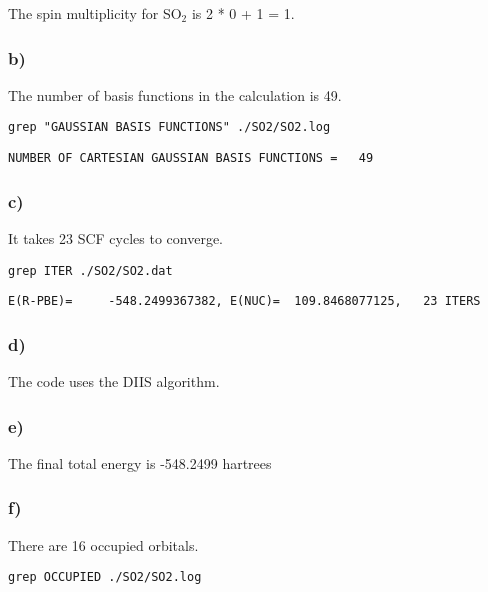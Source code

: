 \documentclass[11pt]{article}
\begin{document}
The spin multiplicity for SO$_{\text{2}}$ is 2 * 0 + 1 = 1. 

\subsubsection{b)}
\label{sec-2-1-2}
The number of basis functions in the calculation is 49.

\begin{verbatim}
grep "GAUSSIAN BASIS FUNCTIONS" ./SO2/SO2.log
\end{verbatim}

\begin{verbatim}
NUMBER OF CARTESIAN GAUSSIAN BASIS FUNCTIONS =   49
\end{verbatim}


\subsubsection{c)}
\label{sec-2-1-3}

It takes 23 SCF cycles to converge.

\begin{verbatim}
grep ITER ./SO2/SO2.dat
\end{verbatim}

\begin{verbatim}
E(R-PBE)=     -548.2499367382, E(NUC)=  109.8468077125,   23 ITERS
\end{verbatim}

\subsubsection{d)}
\label{sec-2-1-4}

The code uses the DIIS algorithm.


\subsubsection{e)}
\label{sec-2-1-5}

The final total energy is -548.2499 hartrees

\subsubsection{f)}
\label{sec-2-1-6}

There are 16 occupied orbitals.

\begin{verbatim}
grep OCCUPIED ./SO2/SO2.log
\end{verbatim}
\end{document}
